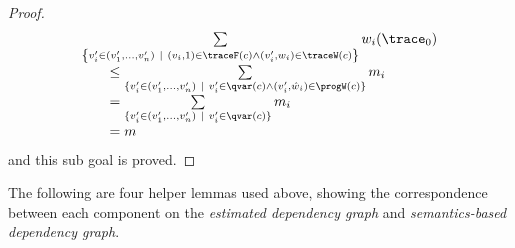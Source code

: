 \begin{proof}
\[\begin{array}{l}
	  \sum\limits_{\left\{v_i' \in (v_1', \ldots, v_n') ~\vert~ (v_i, 1) \in \traceF(c) \land (v_i', w_i) \in \traceW(c) 
	  \right\}} w_i(\trace_0)
	  \\ \qquad 
	  \leq 
	  \sum\limits_{ 
		\{ v_i' \in (v_1', \ldots, v_n') ~\vert~  v_i' \in \qvar(c) \land (v_i', \hat{w}_i) \in \progW(c)\} } m_i
		\\ \qquad 
		= 
		\sum\limits_{ 
		  \{ v_i' \in (v_1', \ldots, v_n') ~\vert~  v_i' \in \qvar(c) \} } m_i
		\\ \qquad 
		= m
	\end{array}
	\]
and this sub goal is proved.
\end{proof}

The following are four helper lemmas used above,
showing the correspondence between
each component on the \emph{estimated dependency graph} and 
\emph{semantics-based dependency graph}.

